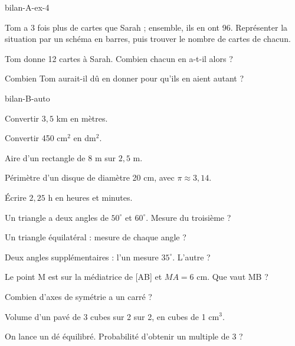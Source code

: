 \begin{blocEdition}{bilan-A-ex-4}
\begin{questions}
\item Tom a 3 fois plus de cartes que Sarah ; ensemble, ils en ont 96. Représenter la situation par un schéma en barres, puis trouver le nombre de cartes de chacun.
\item Tom donne 12 cartes à Sarah. Combien chacun en a-t-il alors ?
\item Combien Tom aurait-il dû en donner pour qu’ils en aient autant ?
\end{questions}\par{}\par\par{}\par{}\par{}\par{}\par{}\par{}
\end{blocEdition}
\begin{blocEdition}{bilan-B-auto}
\begin{questions}
\item Convertir $3{,}5$ km en mètres.
\item Convertir 450 cm$^2$ en dm$^2$.
\item Aire d’un rectangle de 8 m sur $2{,}5$ m.
\item Périmètre d’un disque de diamètre 20 cm, avec $\pi\approx3{,}14$.
\item Écrire $2{,}25$ h en heures et minutes.
\item Un triangle a deux angles de $50^\circ$ et $60^\circ$. Mesure du troisième ?
\item Un triangle équilatéral : mesure de chaque angle ?
\item Deux angles supplémentaires : l’un mesure $35^\circ$. L’autre ?
\item Le point M est sur la médiatrice de [AB] et $MA=6$ cm. Que vaut MB ?
\item Combien d’axes de symétrie a un carré ?
\item Volume d’un pavé de 3 cubes sur 2 sur 2, en cubes de 1 cm$^3$.
\item On lance un dé équilibré. Probabilité d’obtenir un multiple de 3 ?\end{questions}
\end{blocEdition}
